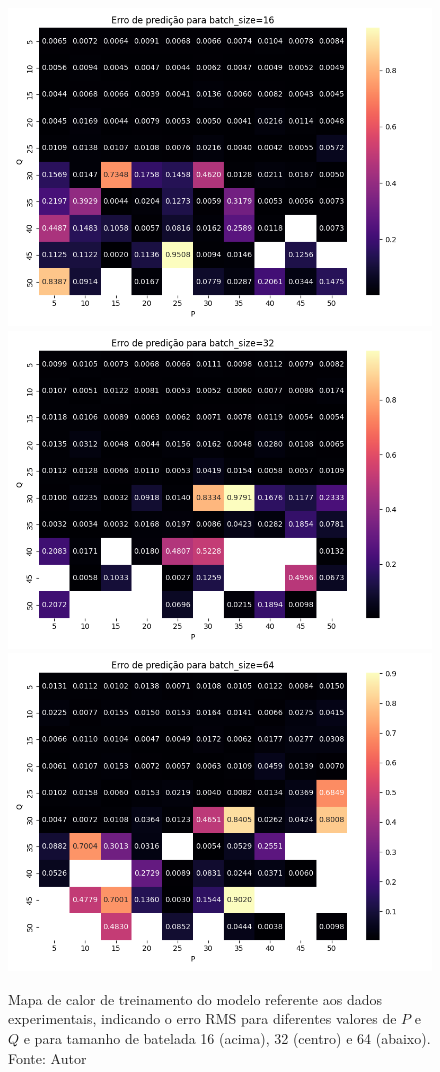 \begin{figure}[hbt!]
    \centering
    \includegraphics[width=0.7\linewidth]{Imagens/chap04/experiment_hp_metrics_16.png}
    \hfill
    \includegraphics[width=0.7\linewidth]{Imagens/chap04/experiment_hp_metrics_32.png}
    \hfill
    \includegraphics[width=0.7\linewidth]{Imagens/chap04/experiment_hp_metrics_64.png}
    \caption{Mapa de calor de treinamento do modelo referente aos dados experimentais, indicando o erro RMS para diferentes valores de $P$ e $Q$ e para tamanho de batelada 16 (acima), 32 (centro) e 64 (abaixo). Fonte: Autor}
    \label{fig:exp_hp_metrics}
\end{figure}

